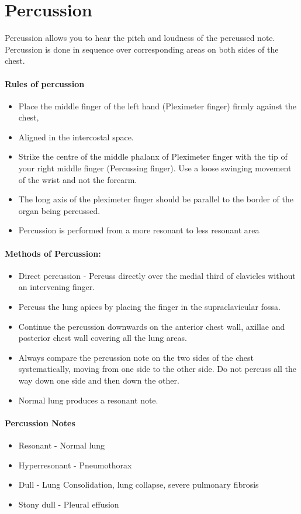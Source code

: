 \documentclass[a4paper,12pt,openany,oneside]{book}
\begin{document}
\section*{Percussion}
Percussion  allows  you  to  hear  the  pitch  and  loudness  of  the  percussed  note.  Percussion is done in sequence over corresponding areas on both sides of the chest.

\paragraph{Rules of percussion}
\begin{itemize}
\item{Place the middle finger of the left hand (Pleximeter finger) firmly against the chest,}
\item{Aligned in the intercostal space.}
\item{Strike the centre of the middle phalanx of Pleximeter finger with the tip of your right middle finger (Percussing finger). Use a loose swinging movement of the wrist and not the forearm.}
\item{The long axis of the pleximeter finger should be parallel to the border of the organ being percussed.}
\item{Percussion is performed from a more resonant to less resonant area}
\end{itemize}

\paragraph{Methods of Percussion:}
\begin{itemize}
\item{Direct  percussion  -  Percuss  directly  over  the  medial  third  of  clavicles  without  an intervening finger.}
\item{Percuss the lung apices by placing the finger in the supraclavicular fossa.}
\item{Continue the percussion downwards on the anterior chest wall, axillae and posterior chest wall covering all the lung areas.}
\item{Always  compare  the  percussion  note  on  the  two  sides  of  the  chest systematically, moving from one side to the other side. Do not percuss all the way down one side and then down the other.}
\item{Normal lung produces a resonant note.}
\end{itemize}

\paragraph{Percussion Notes}
\begin{itemize}
\item{Resonant 		- 	Normal lung}
\item{Hyperresonant 	-	Pneumothorax}
\item{Dull 			-	Lung Consolidation, lung collapse, severe pulmonary 					fibrosis }
\item{Stony dull 		-	Pleural effusion}
\end{itemize}
\end{document}
